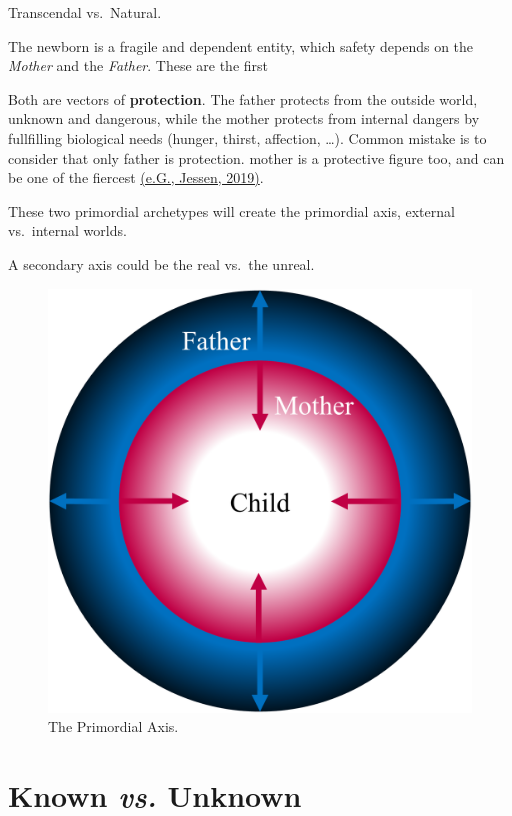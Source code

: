 \documentclass[]{book}
\begin{document}
Transcendal vs.~Natural.

The newborn is a fragile and dependent entity, which safety depends on the \emph{Mother} and the \emph{Father}. These are the first

Both are vectors of \textbf{protection}. The father protects from the outside world, unknown and dangerous, while the mother protects from internal dangers by fullfilling biological needs (hunger, thirst, affection, \ldots). Common mistake is to consider that only father is protection. mother is a protective figure too, and can be one of the fiercest \href{https://doi.org/10.1101/827626}{(e.G., Jessen, 2019)}.

These two primordial archetypes will create the primordial axis, external vs.~internal worlds.

A secondary axis could be the real vs.~the unreal.

\begin{figure}

{\centering \includegraphics[width=\textwidth]{img/protection} 

}

\caption{The Primordial Axis.}\label{fig:unnamed-chunk-9}
\end{figure}

\hypertarget{known-vs.-unknown}{%
\section{\texorpdfstring{Known \emph{vs.} Unknown}{Known vs. Unknown}}\label{known-vs.-unknown}}
\end{document}
